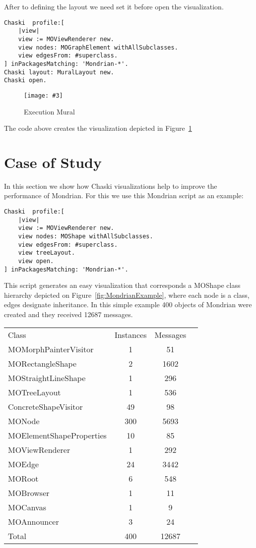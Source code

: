 \documentclass{sig-alternate}
\newcommand{\fig}[4]{
	\begin{figure}[#1]
		\centering
		\texttt{[image: \#3]}
		\caption{\label{fig:#3}#4}
	\end{figure}}
\newcommand{\seclabel}[1]{\label{sec:#1}}
\newcommand{\figref}[1]{Figure~\ref{fig:#1}}
\begin{document}
After to defining the layout we need set it before open the visualization. 
\begin{lstlisting}[language=Smalltalk]
Chaski  profile:[
	|view|
	view := MOViewRenderer new.
	view nodes: MOGraphElement withAllSubclasses.
	view edgesFrom: #superclass.
] inPackagesMatching: 'Mondrian-*'.
Chaski layout: MuralLayout new.
Chaski open.
\end{lstlisting}
\fig{}{0.5}{ExecutionMural}{Execution Mural}
The code above creates the visualization depicted in \figref{ExecutionMural}

\section{Case of Study}\seclabel{case study}

In this section we show how Chaski visualizations help to improve the performance of Mondrian.
For this we use this Mondrian script as an example:
\begin{lstlisting}[language=Smalltalk]
Chaski  profile:[
	|view|
	view := MOViewRenderer new.
	view nodes: MOShape withAllSubclasses.
	view edgesFrom: #superclass.
	view treeLayout.
	view open.
] inPackagesMatching: 'Mondrian-*'.
\end{lstlisting}

This script generates an easy visualization that corresponds a MOShape class hierarchy depicted on \figref{MondrianExample}, where each node is a class, edges designate inheritance. In this simple example 400 objects of Mondrian were created and they received 12687 messages.

\begin{center}
   \begin{tabular}{|l||ccr|} \hline
	Class & Instances & Messages \\
	MOMorphPainterVisitor & 1 & 51	\\
	MORectangleShape & 2 & 1602	\\
	MOStraightLineShape & 1 & 296	\\
	MOTreeLayout & 1 & 536	\\
	ConcreteShapeVisitor & 49 & 98 \\
	MONode & 300 & 5693\\
	MOElementShapeProperties & 10 & 85\\
	MOViewRenderer & 1 & 292\\
	MOEdge & 24 & 3442\\
	MORoot & 6 & 548\\
	MOBrowser & 1 & 11\\
	MOCanvas & 1 & 9\\
	MOAnnouncer & 3 & 24\\
	Total & 400 & 12687 \\
   \end{tabular}
\end{center}
\end{document}
